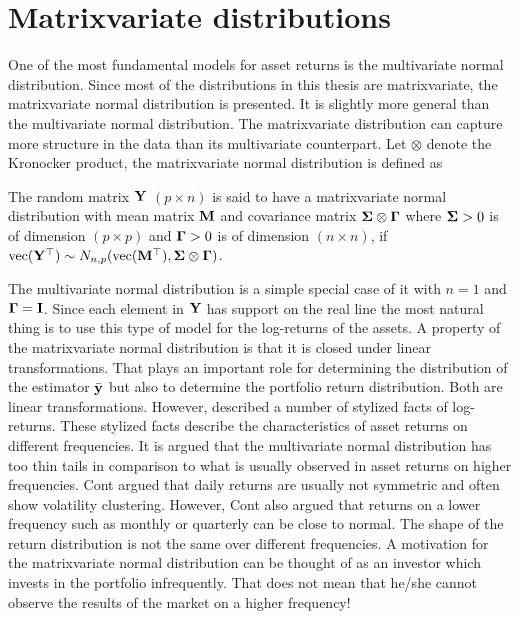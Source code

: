 \documentclass[12pt, twoside]{book}\usepackage{knitr}
\begin{document}
\section{Matrixvariate distributions}
One of the most fundamental models for asset returns is the multivariate normal distribution. 
Since most of the distributions in this thesis are matrixvariate, the matrixvariate normal distribution is presented. 
It is slightly more general than the multivariate normal distribution. 
The matrixvariate distribution can capture more structure in the data than its multivariate counterpart.
Let $\otimes$ denote the Kronocker product, the matrixvariate normal distribution is defined as
\begin{definition}\label{def:matrixnormal}
	The random matrix $\mathbf{Y}$ $(p \times n)$ is said to have a matrixvariate normal distribution with mean matrix $\mathbf{M}$ and covariance matrix $\mathbf{\Sigma} \otimes \boldsymbol{\Gamma}$ where $\mathbf{\Sigma} > 0$ is of dimension $(p \times p)$ and $\boldsymbol{\Gamma} >0$ is of dimension $(n \times n)$, if $\operatorname{vec}(\mathbf{Y}^\top) \sim N_{n,p}(\operatorname{vec}(\mathbf{M}^\top), \mathbf{\Sigma} \otimes \boldsymbol{\Gamma})$.
\end{definition}
The multivariate normal distribution is a simple special case of it with $n=1$ and $\boldsymbol{\Gamma} = \mathbf{I}$.
Since each element in $\mathbf{Y}$ has support on the real line the most natural thing is to use this type of model for the log-returns of the assets.
A property of the matrixvariate normal distribution is that it is closed under linear transformations.
That plays an important role for determining the distribution of the estimator $\bar{\mathbf{y}}$ but also to determine the portfolio return distribution.
Both are linear transformations.
However, \citet{cont2001empirical} described a number of stylized facts of log-returns. 
These stylized facts describe the characteristics of asset returns on different frequencies.  
It is argued that the multivariate normal distribution has too thin tails in comparison to what is usually observed in asset returns on higher frequencies.
Cont argued that daily returns are usually not symmetric and often show volatility clustering.
However, Cont also argued that returns on a lower frequency such as monthly or quarterly can be close to normal.
The shape of the return distribution is not the same over different frequencies. 
A motivation for the matrixvariate normal distribution can be thought of as an investor which invests in the portfolio infrequently.
That does not mean that he/she cannot observe the results of the market on a higher frequency!
\end{document}
